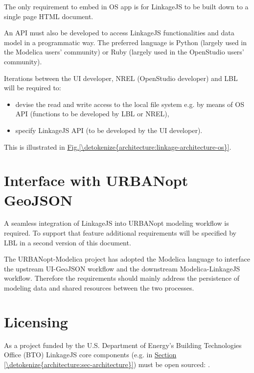 \documentclass[letterpaper,10pt, openany,english]{sphinxmanual}
\begin{document}
The only requirement to embed in OS app is for LinkageJS to be built down to a single page HTML document.

An API must also be developed to access LinkageJS functionalities and data model in a programmatic way. The preferred language is Python (largely used in the Modelica users’ community) or Ruby (largely used in the OpenStudio users’ community).

Iterations between the UI developer, NREL (OpenStudio developer) and LBL will be required to:
\begin{itemize}
\item {} 
devise the read and write access to the local file system e.g. by means of OS API (functions to be developed by LBL or NREL),

\item {} 
specify LinkageJS API (to be developed by the UI developer).

\end{itemize}

This is illustrated in \hyperref[\detokenize{architecture:linkage-architecture-os}]{Fig.\@ \ref{\detokenize{architecture:linkage-architecture-os}}}.


\section{Interface with URBANopt GeoJSON}
\label{\detokenize{requirements:interface-with-urbanopt-geojson}}
A seamless integration of LinkageJS into URBANopt modeling workflow is required. To support that feature additional requirements will be specified by LBL in a second version of this document.

The URBANopt-Modelica project has adopted the Modelica language to interface the upstream UI-GeoJSON workflow and the downstream Modelica-LinkageJS workflow. Therefore the requirements should mainly address the persistence of modeling data and shared resources between the two processes.


\section{Licensing}
\label{\detokenize{requirements:licensing}}
As a project funded by the U.S. Department of Energy’s Building Technologies Office (BTO) LinkageJS core components (e.g.  in \hyperref[\detokenize{architecture:sec-architecture}]{Section \ref{\detokenize{architecture:sec-architecture}}}) must be open sourced: .
\end{document}
